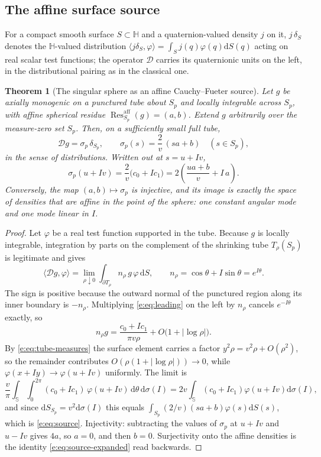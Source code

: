 \documentclass[11pt,a4paper]{article}
\numberwithin{equation}{section}
\newtheorem{theorem}{Theorem}[section]
\theoremstyle{definition}
\theoremstyle{remark}
\theoremstyle{plain}
\newcommand{\HH}{\mathbb H}
\newcommand{\SSS}{\mathbb S}
\newcommand{\Dop}{\mathcal D}
\newcommand{\Sp}{S_{p}}
\newcommand{\Tube}{T}
\newcommand{\abs}[1]{\lvert #1\rvert}
\newcommand{\dd}{\mathrm d}
\newcommand{\Resaff}{\operatorname{Res}^{\mathrm{aff}}}
\begin{document}
\subsection{The affine surface source}
\label{e:sec:surface-source}

For a compact smooth surface $S\subset\HH$ and a quaternion-valued
density $j$ on it, $j\,\delta_S$ denotes the $\HH$-valued distribution
$\langle j\delta_S,\varphi\rangle=\int_Sj(q)\varphi(q)\dd S(q)$ acting on
real scalar test functions; the operator $\Dop$ carries its quaternionic
units on the left, in the distributional pairing as in the classical one.

\begin{theorem}[The singular sphere as an affine Cauchy--Fueter source]
\label{e:thm:source}
Let $g$ be axially monogenic on a punctured tube about $\Sp$ and
\emph{locally integrable across $\Sp$}, with affine spherical residue
$\Resaff_{\Sp}(g)=(a,b)$. Extend $g$ arbitrarily over the measure-zero
set $\Sp$. Then, on a sufficiently small full tube,
\begin{equation}
 \Dop g=\sigma_p\,\delta_{\Sp},
 \qquad
 \sigma_p(s)=\frac2v\,(sa+b)\quad (s\in\Sp),
 \label{e:eq:source}
\end{equation}
in the sense of distributions. Written out at $s=u+Iv$,
\begin{equation}
 \sigma_p(u+Iv)=\frac2v\bigl(c_0+Ic_1\bigr)
   =2\left(\frac{ua+b}{v}+I\,a\right).
 \label{e:eq:source-expanded}
\end{equation}
Conversely, the map $(a,b)\mapsto\sigma_p$ is injective, and its image is
exactly the space of densities that are \emph{affine} in the point of the
sphere: one constant angular mode and one mode linear in $I$.
\end{theorem}

\begin{proof}
Let $\varphi$ be a real test function supported in the tube. Because $g$
is locally integrable, integration by parts on the complement of the
shrinking tube $\Tube_\rho(\Sp)$ is legitimate and gives
\[
 \langle\Dop g,\varphi\rangle
   =\lim_{\rho\downarrow0}\int_{\partial\Tube_\rho}
        n_\rho\,g\,\varphi\,\dd S,
 \qquad n_\rho=\cos\theta+I\sin\theta=e^{I\theta}.
\]
The sign is positive because the outward normal of the punctured region
along its inner boundary is $-n_\rho$. Multiplying \eqref{e:eq:leading}
on the left by $n_\rho$ cancels $e^{-I\theta}$ exactly, so
\[
 n_\rho g=\frac{c_0+Ic_1}{\pi v\rho}+O\bigl(1+\abs{\log\rho}\bigr).
\]
By \eqref{e:eq:tube-measures} the surface element carries a factor
$y^2\rho=v^2\rho+O(\rho^2)$, so the remainder contributes
$O(\rho(1+\abs{\log\rho}))\to0$, while $\varphi(x+Iy)\to\varphi(u+Iv)$
uniformly. The limit is
\[
 \frac{v}{\pi}\int_{\SSS}\int_0^{2\pi}
   (c_0+Ic_1)\,\varphi(u+Iv)\,\dd\theta\,\dd\sigma(I)
 =2v\int_{\SSS}(c_0+Ic_1)\varphi(u+Iv)\dd\sigma(I),
\]
and since $\dd S_{\Sp}=v^2\dd\sigma(I)$ this equals
$\int_{\Sp}(2/v)(sa+b)\varphi(s)\dd S(s)$, which is
\eqref{e:eq:source}. Injectivity: subtracting the values of $\sigma_p$ at
$u+Iv$ and $u-Iv$ gives $4a$, so $a=0$, and then $b=0$. Surjectivity onto
the affine densities is the identity \eqref{e:eq:source-expanded} read
backwards.
\end{proof}
\end{document}
